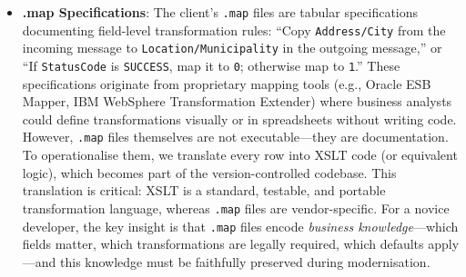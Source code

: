 \documentclass[11pt]{article}
\begin{document}
\begin{itemize}
  \vspace{0.5em}
  \noindent{}
  \vspace{0.5em}

  \item \textbf{.map Specifications}: The client's \texttt{.map} files are tabular specifications documenting field-level transformation rules: ``Copy \texttt{Address/City} from the incoming message to \texttt{Location/Municipality} in the outgoing message,'' or ``If \texttt{StatusCode} is \texttt{SUCCESS}, map it to \texttt{0}; otherwise map to \texttt{1}.'' These specifications originate from proprietary mapping tools (e.g., Oracle ESB Mapper, IBM WebSphere Transformation Extender) where business analysts could define transformations visually or in spreadsheets without writing code. However, \texttt{.map} files themselves are not executable—they are documentation. To operationalise them, we translate every row into XSLT code (or equivalent logic), which becomes part of the version-controlled codebase. This translation is critical: XSLT is a standard, testable, and portable transformation language, whereas \texttt{.map} files are vendor-specific. For a novice developer, the key insight is that \texttt{.map} files encode \emph{business knowledge}—which fields matter, which transformations are legally required, which defaults apply—and this knowledge must be faithfully preserved during modernisation.

  \vspace{0.5em}
\noindent{}
  \vspace{0.5em}


\end{itemize}
\end{document}
